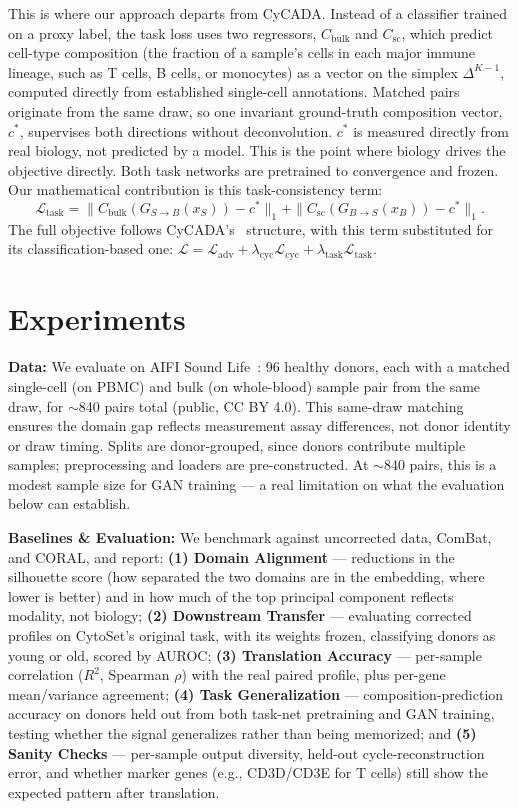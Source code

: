 This is where our approach departs from CyCADA. Instead of a classifier trained on a proxy label, the
task loss uses two regressors, $C_{\text{bulk}}$ and $C_{\text{sc}}$, which predict cell-type
composition (the fraction of a sample's cells in each major immune lineage, such as T cells, B cells, or
monocytes) as a vector on the simplex $\Delta^{K-1}$, computed directly from established single-cell
annotations.
Matched pairs originate from the same draw, so one invariant ground-truth composition vector, $c^*$,
supervises both directions without deconvolution. $c^*$ is measured directly from real biology, not
predicted by a model. This is the point where biology drives the objective directly.
Both task networks are pretrained to convergence and frozen. Our mathematical contribution is this
task-consistency term:
\begin{equation}
\mathcal{L}_{\text{task}} = \|C_{\text{bulk}}(G_{S \to B}(x_S)) - c^*\|_1 +
\|C_{\text{sc}}(G_{B \to S}(x_B)) - c^*\|_1.
\end{equation}
The full objective follows CyCADA's~\cite{hoffman2018cycada} structure, with this term substituted for
its classification-based one: $\mathcal{L} = \mathcal{L}_{\text{adv}} + \lambda_{\text{cyc}}
\mathcal{L}_{\text{cyc}} + \lambda_{\text{task}} \mathcal{L}_{\text{task}}$.

\section{Experiments}
\textbf{Data:} We evaluate on AIFI Sound Life~\cite{gustafson2025soundlife}: 96 healthy donors, each with a matched single-cell (on
PBMC) and bulk (on whole-blood) sample pair from the same draw, for $\sim$840 pairs total (public, CC BY
4.0). This same-draw matching ensures the domain gap reflects measurement assay
differences, not donor identity or draw timing. Splits are donor-grouped, since donors contribute
multiple samples; preprocessing and loaders are pre-constructed. At $\sim$840 pairs, this is a modest sample size for GAN training --- a real limitation
on what the evaluation below can establish.

\textbf{Baselines \& Evaluation:} We benchmark against uncorrected data, ComBat, and CORAL, and report:
\textbf{(1) Domain Alignment} --- reductions in the silhouette score (how separated the two domains are
in the embedding, where lower is better) and in how much of the top principal component reflects
modality, not biology; \textbf{(2) Downstream Transfer} --- evaluating corrected profiles on CytoSet's
original task, with its weights frozen, classifying donors as young or old, scored by AUROC;
\textbf{(3) Translation Accuracy} ---
per-sample correlation ($R^2$, Spearman $\rho$) with the real paired profile, plus per-gene mean/variance
agreement; \textbf{(4) Task Generalization} --- composition-prediction accuracy on donors held out from
both task-net pretraining and GAN training, testing whether the signal generalizes rather than being
memorized; and \textbf{(5) Sanity Checks} --- per-sample output diversity, held-out cycle-reconstruction
error, and whether marker genes (e.g., CD3D/CD3E for T cells) still show the expected pattern after
translation.

